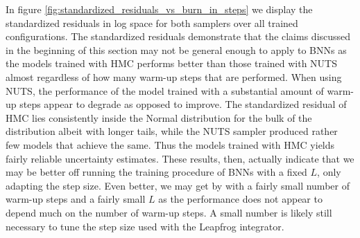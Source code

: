 In figure \ref{fig:standardized_residuals_vs_burn_in_steps} we display the standardized residuals in log space for both samplers over all trained configurations. 
The standardized residuals demonstrate that the claims discussed in the beginning of this section may not be general enough to apply to BNNs as the models trained with HMC performs better than those trained with NUTS almost regardless of how many warm-up steps that are performed. When using NUTS, the performance of the model trained with a substantial amount of warm-up steps appear to degrade as opposed to improve. The standardized residual of HMC lies consistently inside the Normal distribution for the bulk of the distribution albeit with longer tails, while the NUTS sampler produced rather few models that achieve the same.
Thus the models trained with HMC yields fairly reliable uncertainty estimates. These results, then, actually indicate that we may be better off running the training procedure of BNNs with a fixed $L$, only adapting the step size. Even better, we may get by with a fairly small number of warm-up steps and a fairly small $L$ as the performance does not appear to depend much on the number of warm-up steps. A small number is likely still necessary to tune the step size used with the Leapfrog integrator. 
